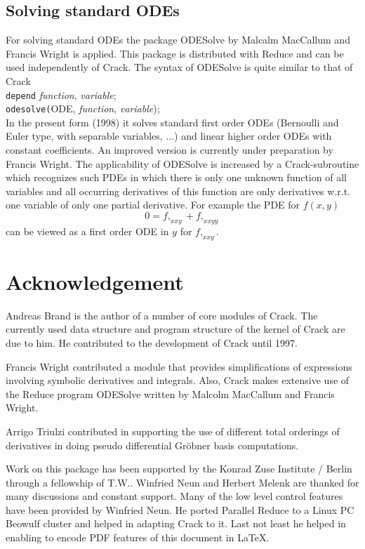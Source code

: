 \documentclass[12pt]{article}
\begin{document}
\subsection{Solving standard ODEs}
For solving standard ODEs the package {\sc ODESolve} by Malcalm MacCallum and
Francis Wright
\cite{Mal} is applied. This package is distributed with {\sc Reduce}
and can be used independently of {\sc Crack}. The syntax of
{\sc ODESolve} is quite similar to that of {\sc Crack} \\
\verb+depend+ {\it function}, {\it variable}; \\
\verb+odesolve(+ODE, {\it function}, {\it variable});  \\
In the present form (1998) it solves standard first order ODEs
(Bernoulli and Euler type, with separable variables, $\ldots$) and linear
higher order ODEs with constant coefficients.
An improved version is currently under preparation by Francis Wright.
The applicability of {\sc ODESolve} is
increased by a {\sc Crack}-subroutine which recognizes such PDEs in which
there is only one unknown function of all variables and all occurring
derivatives of this function
are only derivatives w.r.t. one variable of only one partial derivative.
For example the PDE for $f(x,y)$
\[ 0 = f,_{xxy} + f,_{xxyy} \]
can be viewed as a first order ODE in $y$ for $f,_{xxy}.$

\section*{Acknowledgement}
Andreas Brand is the author of a number of core modules of {\sc
Crack}. The currently used data structure and program structure of the
kernel of {\sc Crack} are due to him. He contributed to the
development of {\sc Crack} until 1997.

Francis Wright contributed a module that provides simplifications
of expressions involving symbolic derivatives and integrals. Also, {\sc Crack}
makes extensive use of the {\sc Reduce} program {\sc ODESolve} written
by Malcolm MacCallum and Francis Wright.

Arrigo Triulzi contributed in supporting the use of different total
orderings of derivatives in doing pseudo differential Gr\"{o}bner
basis computations.

Work on this package has been supported by the Konrad Zuse
Institute / Berlin through a fellowship of T.W..  Winfried
Neun and Herbert Melenk are thanked for many discussions and
constant support. Many of the low level control features have
been provided by Winfried Neun. He ported Parallel Reduce to
a Linux PC Beowulf cluster and helped in adapting {\sc Crack}
to it. Last not least he helped in enabling to encode PDF features of
this document in LaTeX.
\end{document}
